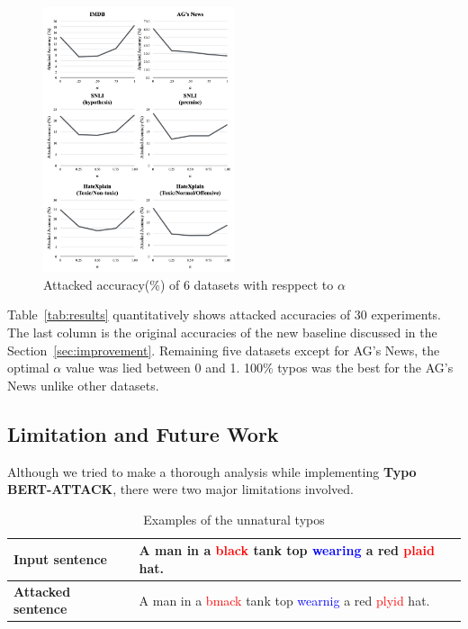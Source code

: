 \documentclass[11pt,a4paper]{article}
\newcommand{\red}[1]{\textcolor{red}{#1}}
\newcommand{\blue}[1]{\textcolor{blue}{#1}}
\begin{document}
  \begin{figure}[hbt!]
    \centering
    \includegraphics[width=0.5\textwidth]{figure2}
    \caption{Attacked accuracy(\%) of 6 datasets with resppect to $\alpha$}
    \label{fig:results}
  \end{figure}
  
  Table~\ref{tab:results} quantitatively shows attacked accuracies of 30 experiments. The last column is the original accuracies of the new baseline discussed in the Section~\ref{sec:improvement}.
  Remaining five datasets except for AG's News, the optimal $\alpha$ value was lied between 0 and 1.
  100\% typos was the best for the AG's News unlike other datasets.




\subsection{Limitation and Future Work}
Although we tried to make a thorough analysis while implementing \textbf{Typo BERT-ATTACK}, there were two major limitations involved.

{
\renewcommand{\arraystretch}{1.5}
\begin{table}[hbt!]
{\small
    \begin{tabularx}{\columnwidth}{l|X}
    \hline
    \textbf{Input sentence}      & A man in a \red{black} tank top \blue{wearing} a red \red{plaid} hat. \\ \hline
    \textbf{Attacked sentence}   & A man in a \red{bmack} tank top \blue{wearnig} a red \red{plyid} hat. \\ \hline  
    \end{tabularx}%
    }
    \caption{Examples of the unnatural typos}
    \label{tab:example-unnatural}
    \end{table}
}
\end{document}
